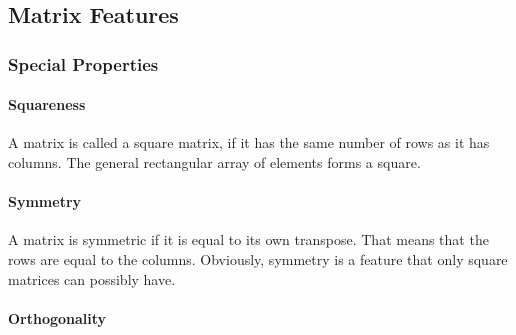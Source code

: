 
\subsection{Matrix Features}


\subsubsection{Special Properties}

\paragraph{Squareness}
A matrix is called a square matrix, if it has the same number of rows as it has columns. The general rectangular array of elements forms a square.

\paragraph{Symmetry}
A matrix is symmetric if it is equal to its own transpose. That means that the rows are equal to the columns. Obviously, symmetry is a feature that only square matrices can possibly have.


\paragraph{Orthogonality}

